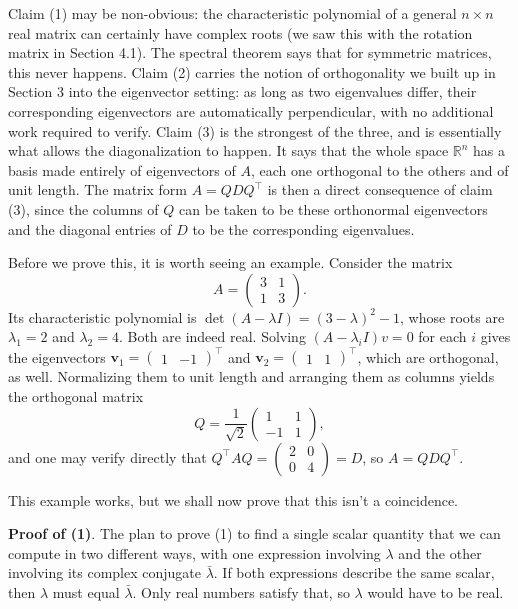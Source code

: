 \documentclass{article}
\begin{document}
Claim (1) may be non-obvious: the characteristic polynomial of a general $n \times n$ real matrix can certainly have complex roots (we saw this with the rotation matrix in Section 4.1). The spectral theorem says that for symmetric matrices, this never happens. Claim (2) carries the notion of orthogonality we built up in Section 3 into the eigenvector setting: as long as two eigenvalues differ, their corresponding eigenvectors are automatically perpendicular, with no additional work required to verify. Claim (3) is the strongest of the three, and is essentially what allows the diagonalization to happen. It says that the whole space $\mathbb{R}^n$ has a basis made entirely of eigenvectors of $A$, each one orthogonal to the others and of unit length. The matrix form $A = QDQ^\top$ is then a direct consequence of claim (3), since the columns of $Q$ can be taken to be these orthonormal eigenvectors and the diagonal entries of $D$ to be the corresponding eigenvalues.
 
Before we prove this, it is worth seeing an example. Consider the matrix
$$A = \begin{pmatrix} 3 & 1 \\ 1 & 3 \end{pmatrix}.$$
Its characteristic polynomial is $\det(A - \lambda I) = (3 - \lambda)^2 - 1$, whose roots are $\lambda_1 = 2$ and $\lambda_2 = 4$. Both are indeed real. Solving $(A - \lambda_i I)v = 0$ for each $i$ gives the eigenvectors $\textbf{v}_1 = \begin{pmatrix} 1 & -1\end{pmatrix}^\top$ and $\textbf{v}_2 = \begin{pmatrix} 1 & 1\end{pmatrix}^\top$, which are orthogonal, as well. Normalizing them to unit length and arranging them as columns yields the orthogonal matrix
$$Q = \frac{1}{\sqrt{2}}\begin{pmatrix} 1 & 1 \\ -1 & 1 \end{pmatrix},$$
and one may verify directly that $Q^\top A Q = \begin{pmatrix} 2 & 0 \\ 0 & 4 \end{pmatrix} = D$, so $A = QDQ^\top$.
 
This example works, but we shall now prove that this isn't a coincidence.
 
\textbf{Proof of (1)}. The plan to prove (1) to find a single scalar quantity that we can compute in two different ways, with one expression involving $\lambda$ and the other involving its complex conjugate $\bar\lambda$. If both expressions describe the same scalar, then $\lambda$ must equal $\bar\lambda$. Only real numbers satisfy that, so $\lambda$ would have to be real. 
\end{document}
